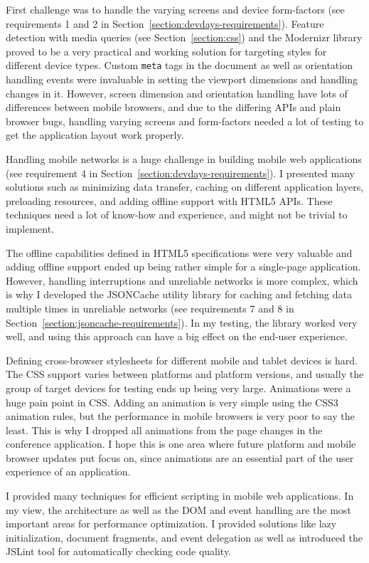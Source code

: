 First challenge was to handle the varying screens and device
form-factors (see requirements 1 and 2 in
Section~\ref{section:devdays-requirements}). Feature detection with
media queries (see Section~\ref{section:css}) and the Modernizr
library proved to be a very practical and working solution for
targeting styles for different device types. Custom \texttt{meta} tags
in the document as well as orientation handling events were invaluable
in setting the viewport dimensions and handling changes in
it. However, screen dimension and orientation handling have lots of
differences between mobile browsers, and due to the differing APIs and
plain browser bugs, handling varying screens and form-factors needed a
lot of testing to get the application layout work properly.

Handling mobile networks is a huge challenge in building mobile web
applications (see requirement 4 in
Section~\ref{section:devdays-requirements}). I presented many
solutions such as minimizing data transfer, caching on different
application layers, preloading resources, and adding offline support
with HTML5 APIs. These techniques need a lot of know-how and
experience, and might not be trivial to implement.

The offline capabilities defined in HTML5 specifications were very
valuable and adding offline support ended up being rather simple for a
single-page application. However, handling interruptions and
unreliable networks is more complex, which is why I developed the
JSONCache utility library for caching and fetching data multiple times
in unreliable networks (see requirements 7 and 8 in
Section~\ref{section:jsoncache-requirements}). In my testing, the
library worked very well, and using this approach can have a big
effect on the end-user experience.

Defining cross-browser stylesheets for different mobile and tablet
devices is hard. The CSS support varies between platforms and platform
versions, and usually the group of target devices for testing ends up
being very large. Animations were a huge pain point in CSS. Adding an
animation is very simple using the CSS3 animation rules, but the
performance in mobile browsers is very poor to say the least. This is
why I dropped all animations from the page changes in the conference
application. I hope this is one area where future platform and mobile
browser updates put focus on, since animations are an essential part
of the user experience of an application.

I provided many techniques for efficient scripting in mobile web
applications. In my view, the architecture as well as the DOM and
event handling are the most important areas for performance
optimization. I provided solutions like lazy initialization, document
fragments, and event delegation as well as introduced the JSLint tool
for automatically checking code quality.

